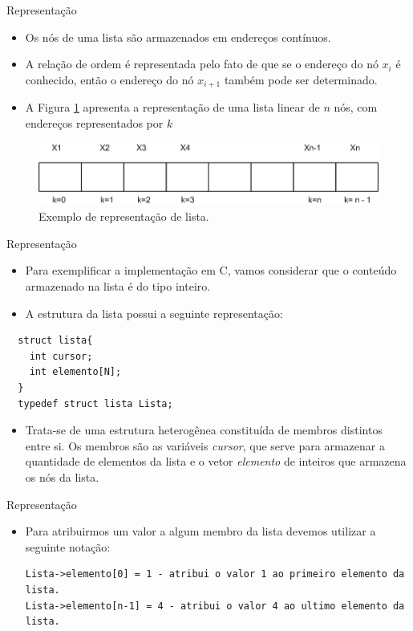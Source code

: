 \begin{frame}{Representação}
\begin{itemize}
	\item Os nós de uma lista são armazenados em endereços contínuos.
	\item A relação de ordem é representada pelo fato de que se o endereço do nó $x_i$ é conhecido, então o endereço do nó $x_{i+1}$ também pode ser determinado. 	
	\item A Figura \ref{fig:lista-linear-repre} apresenta a representação de uma lista linear de $n$ nós, com endereços representados por $k$
\end{itemize}
\begin{figure}[ht]
	\centering
		\includegraphics[width=.6\textwidth]{figs/fig_listas/lista-linear.png}				\caption{Exemplo de representação de lista.}	
				\label{fig:lista-linear-repre}
			\end{figure} 
\end{frame}

\begin{frame}[fragile]{Representação}
\begin{itemize}
	\item Para exemplificar a implementação em C, vamos considerar que o conteúdo armazenado na lista é do tipo inteiro.
	\item A estrutura da lista possui a seguinte representação:	
\end{itemize}
\begin{verbatim}
  struct lista{
    int cursor;
    int elemento[N];
  }
  typedef struct lista Lista;
\end{verbatim}
\begin{itemize}
	\item Trata-se de uma estrutura heterogênea constituída de membros distintos entre si. Os membros são as variáveis \alert{\textit{cursor}}, que serve para armazenar a quantidade de elementos da lista e o vetor \alert{\textit{elemento}} de inteiros que armazena os nós da lista.
\end{itemize}
\end{frame}

\begin{frame}[fragile]{Representação}
\begin{itemize}
	\item Para atribuirmos um valor a algum membro da lista devemos utilizar a seguinte notação:

\small	
\begin{lstlisting}
Lista->elemento[0] = 1 - atribui o valor 1 ao primeiro elemento da lista.
Lista->elemento[n-1] = 4 - atribui o valor 4 ao ultimo elemento da lista.
\end{lstlisting}
\end{itemize}
\end{frame}  


